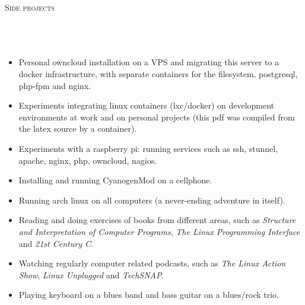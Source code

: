 \noindent
\textsc{\Huge Side projects} \\\\\\\\
\begin{itemize}
    \vspace{-2.5mm}
    \itemsep-1mm
    \item Personal owncloud installation on a VPS and migrating this server to
        a docker infrastructure, with separate containers for the filesystem,
        postgresql, php-fpm and nginx.
    \item Experiments integrating linux containers (lxc/docker) on development
        environments at work and on personal projects (this pdf was compiled
        from the latex source by a container).
    \item Experiments with a raspberry pi: running services such as ssh,
        stunnel, apache, nginx, php, owncloud, nagios.
    \item Installing and running CyanogenMod on a cellphone.
    \item Running arch linux on all computers (a never-ending adventure in
        itself).
    \item Reading and doing exercises of books from different areas, such as
        \textit{Structure and Interpretation of Computer Programs}, \textit{The
        Linux Programming Interface} and \textit{21st Century C}.
    \item Watching regularly computer related podcasts, such as \textit{The
        Linux Action Show}, \textit{Linux Unplugged} and \textit{TechSNAP}.
    \item Playing keyboard on a blues band and bass guitar on a blues/rock
        trio.
\end{itemize}
